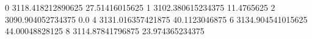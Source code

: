 0 3118.418212890625 27.51416015625
1 3102.380615234375 11.4765625
2 3090.904052734375 0.0
4 3131.016357421875 40.1123046875
6 3134.904541015625 44.00048828125
8 3114.87841796875 23.974365234375
